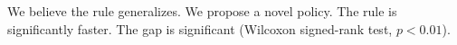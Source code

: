 \documentclass{article}
\begin{document}
We believe the rule generalizes.
We propose a novel policy.
The rule is significantly faster.
The gap is significant (Wilcoxon signed-rank test, $p < 0.01$).
\end{document}
